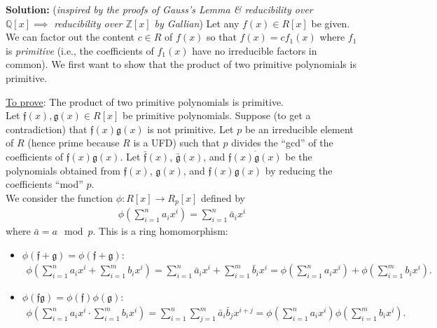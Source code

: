 \documentclass[12pt]{article}
\newcommand{\lp}{\left(}
\newcommand{\rp}{\right)}
\begin{document}
\noindent \textbf{Solution:} (\textit{inspired by the proofs of Gauss's Lemma \& reducibility over $\mathbb{Q}[x] \implies$ reducibility over $\mathbb{Z}[x]$ by Gallian}) Let any $f(x) \in R[x]$ be given. We can factor out the content $c \in R$ of $f(x)$ so that $f(x) = cf_1(x)$ where $f_1$ is \textit{primitive} (i.e., the coefficients of $f_1(x)$ have no irreducible factors in common). We first want to show that the product of two primitive polynomials is primitive. 

\begin{framed}
\noindent \underline{To prove}: The product of two primitive polynomials is primitive.\\

Let $\mathfrak{f}(x),\mathfrak{g}(x) \in R[x]$ be primitive polynomials. Suppose (to get a contradiction) that $\mathfrak{f}(x)\mathfrak{g}(x)$ is not primitive. Let $p$ be an irreducible element of $R$ (hence prime because $R$ is a UFD) such that $p$ divides the ``gcd'' of the coefficients of $\mathfrak{f}(x) \mathfrak{g}(x)$. Let $\bar{\mathfrak{f}}(x)$, $\bar{\mathfrak{g}}(x)$, and $\overline{\mathfrak{f}(x)\mathfrak{g}(x)}$ be the polynomials obtained from $\mathfrak{f}(x)$, $\mathfrak{g}(x)$, and $\mathfrak{f}(x)\mathfrak{g}(x)$ by reducing the coefficients ``mod'' $p$. \\

We consider the function $\phi: R[x] \to R_p[x]$ defined by 
\begin{align*}
\phi \lp \sum^n_{i=1}a_i x^i \rp = \sum^n_{i=1}\bar{a}_ix^i
\end{align*}
where $\bar{a} = a\mod p$. This is a ring homomorphism:
\begin{itemize}
	\item $\phi(\mathfrak{f} + \mathfrak{g}) = \phi(\mathfrak{f}+\mathfrak{g})$:
	\begin{align*}
	\phi\lp \sum^n_{i=1}a_i x^i + \sum^m_{i=1}b_i x^i \rp = \sum^n_{i=1}\bar{a}_i x^i + \sum^m_{i=1}\bar{b}_i x^i = \phi\lp \sum^n_{i=1}a_i x^i \rp + \phi\lp \sum^m_{i=1}b_i x^i \rp.
	\end{align*}
	\item $\phi(\mathfrak{f}\mathfrak{g}) = \phi(\mathfrak{f})\phi(\mathfrak{g})$:
	\begin{align*}
	\phi\lp \sum^n_{i=1}a_i x^i \cdot \sum^m_{i=1}b_i x^i \rp= \sum_{i=1}^n\sum^m_{j=1}\bar{a}_i\bar{b}_j x^{i+j} = \phi\lp \sum^n_{i=1}a_i x^i \rp \phi\lp \sum^m_{i=1}b_i x^i \rp.
	\end{align*}
\end{itemize}






\end{framed}
\end{document}
